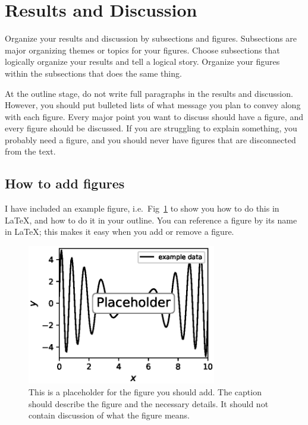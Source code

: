 \documentclass[journal=mamobx, layout=twocolumn]{achemso}
\begin{document}

\section{Results and Discussion}

Organize your results and discussion by subsections and figures.
Subsections are major organizing themes or topics for your figures.
Choose subsections that logically organize your results and tell a logical story.
Organize your figures within the subsections that does the same thing.

At the outline stage, do not write full paragraphs in the results and discussion.
However, you should put bulleted lists of what message you plan to convey along with each figure.
Every major point you want to discuss should have a figure, and every figure should be discussed.
If you are struggling to explain something, you probably need a figure, and you should never have figures that are disconnected from the text.

\subsection{How to add figures}

I have included an example figure, i.e.\ Fig~\ref{fig-placeholder} to show you how to do this in LaTeX, and how to do it in your outline.
You can reference a figure by its name in LaTeX; this makes it easy when you add or remove a figure.

\begin{figure}[tbp]
  \includegraphics[width=3.25in]{fig-placeholder}
  \caption{This is a placeholder for the figure you should add. The caption should describe the figure and the necessary details.
It should not contain discussion of what the figure means.}
  \label{fig-placeholder}
\end{figure}
\end{document}

